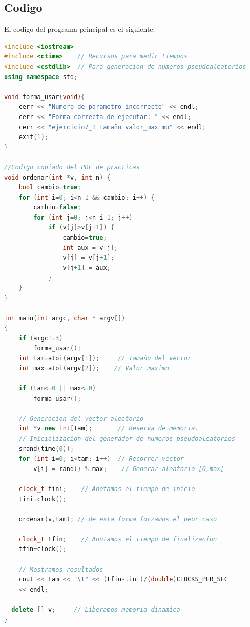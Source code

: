 \documentclass[12pt,a4psprt]{article}
\begin{document}
\subsection{Codigo}
El codigo del programa principal es el siguiente:
\begin{lstlisting}[language=C++]
#include <iostream>
#include <ctime>    // Recursos para medir tiempos
#include <cstdlib>  // Para generacion de numeros pseudoaleatorios
using namespace std;

void forma_usar(void){
	cerr << "Numero de parametro incorrecto" << endl;
	cerr << "Forma correcta de ejecutar: " << endl;
	cerr << "ejercicio7_1 tamaño valor_maximo" << endl;
	exit(1);
}

//Codigo copiado del PDF de practicas
void ordenar(int *v, int n) {
	bool cambio=true;
	for (int i=0; i<n-1 && cambio; i++) {
		cambio=false;
		for (int j=0; j<n-i-1; j++)
			if (v[j]>v[j+1]) {
				cambio=true;
				int aux = v[j];
				v[j] = v[j+1];
				v[j+1] = aux;
			}
	}
}

int main(int argc, char * argv[])
{
	if (argc!=3)
		forma_usar();
	int tam=atoi(argv[1]);     // Tamaño del vector
	int max=atoi(argv[2]);    // Valor maximo
	
	if (tam<=0 || max<=0)
    	forma_usar();
  
	// Generacion del vector aleatorio
	int *v=new int[tam];       // Reserva de memoria.
	// Inicializacion del generador de numeros pseudoaleatorios
	srand(time(0));            
	for (int i=0; i<tam; i++)  // Recorrer vector
		v[i] = rand() % max;    // Generar aleatorio [0,max[

	clock_t tini;    // Anotamos el tiempo de inicio
	tini=clock();

	ordenar(v,tam); // de esta forma forzamos el peor caso
  
	clock_t tfin;    // Anotamos el tiempo de finalizaciun
	tfin=clock();

	// Mostramos resultados
	cout << tam << "\t" << (tfin-tini)/(double)CLOCKS_PER_SEC 
	<< endl;
  
  delete [] v;     // Liberamos memoria dinamica
}

\end{lstlisting}
\end{document}
